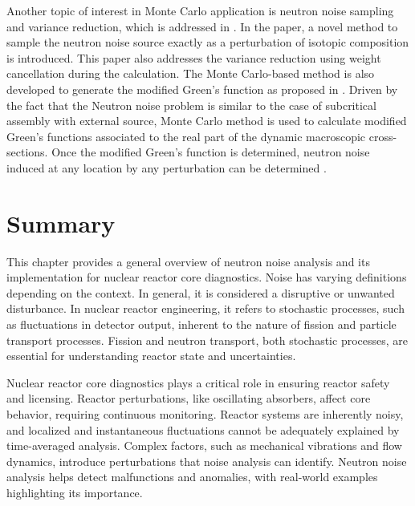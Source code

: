 Another topic of interest in Monte Carlo application is neutron noise sampling and variance reduction, which is addressed in \cite{belangerVarianceReductionNoise2022}. In the paper, a novel method to sample the neutron noise source exactly as a perturbation of isotopic composition is introduced. This paper also addresses the variance reduction using weight cancellation during the calculation. The Monte Carlo-based method is also developed to generate the modified Green’s function as proposed in \cite{demaziereMonteCarlobasedDynamic29}. Driven by the fact that the Neutron noise problem is similar to the case of subcritical assembly with external source, Monte Carlo method is used to calculate modified Green’s functions associated to the real part of the dynamic macroscopic cross-sections. Once the modified Green’s function is determined, neutron noise induced at any location by any perturbation can be determined \cite{demaziereMonteCarlobasedDynamic29}.

\section{Summary}

This chapter provides a general overview of neutron noise analysis and its implementation for nuclear reactor core diagnostics. Noise has varying definitions depending on the context. In general, it is considered a disruptive or unwanted disturbance. In nuclear reactor engineering, it refers to stochastic processes, such as fluctuations in detector output, inherent to the nature of fission and particle transport processes. Fission and neutron transport, both stochastic processes, are essential for understanding reactor state and uncertainties.

Nuclear reactor core diagnostics plays a critical role in ensuring reactor safety and licensing. Reactor perturbations, like oscillating absorbers, affect core behavior, requiring continuous monitoring. Reactor systems are inherently noisy, and localized and instantaneous fluctuations cannot be adequately explained by time-averaged analysis. Complex factors, such as mechanical vibrations and flow dynamics, introduce perturbations that noise analysis can identify. Neutron noise analysis helps detect malfunctions and anomalies, with real-world examples highlighting its importance. 

